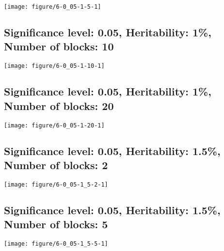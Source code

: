 \documentclass[11pt,letter]{article}\usepackage[]{graphicx}\usepackage[]{color}
\makeatletter
\def\maxwidth{ %
  \ifdim\Gin@nat@width>\linewidth
    \linewidth
  \else
    \Gin@nat@width
  \fi
}
\newenvironment{knitrout}{}{} %
\makeatother
\begin{document}
\begin{knitrout}
\color{fgcolor}
\texttt{[image: figure/6-0\_05-1-5-1]} 

\end{knitrout}

\newpage
\subsection{Significance level: 0.05, Heritability: 1\%, Number of blocks: 10}

\begin{knitrout}
\color{fgcolor}
\texttt{[image: figure/6-0\_05-1-10-1]} 

\end{knitrout}

\newpage
\subsection{Significance level: 0.05, Heritability: 1\%, Number of blocks: 20}

\begin{knitrout}
\color{fgcolor}
\texttt{[image: figure/6-0\_05-1-20-1]} 

\end{knitrout}

\newpage
\subsection{Significance level: 0.05, Heritability: 1.5\%, Number of blocks: 2}

\begin{knitrout}
\color{fgcolor}
\texttt{[image: figure/6-0\_05-1\_5-2-1]} 

\end{knitrout}

\newpage
\subsection{Significance level: 0.05, Heritability: 1.5\%, Number of blocks: 5}

\begin{knitrout}
\color{fgcolor}
\texttt{[image: figure/6-0\_05-1\_5-5-1]} 

\end{knitrout}
\end{document}
